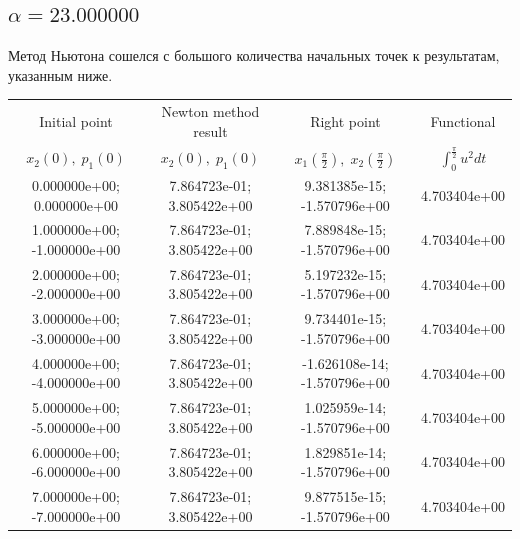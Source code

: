 \documentclass[titlepage]{article}
\def\l{\left}
\def\r{\right}
\begin{document}
\subsection{$\alpha = 23.000000$} 
Метод Ньютона сошелся с большого количества начальных точек к результатам, указанным ниже. \\ 
\begin{tabular}{ | c | c | c | c |} 
\hline 
Initial point  & Newton method result & Right point & Functional 
 \\ $x_2(0), \; p_1(0)$ & $x_2(0), \; p_1(0)$ & $x_1\l(\frac{\pi}{2}\r), \; x_2\l(\frac{\pi}{2}\r)$ & $\int_{0}^{\frac{\pi}{2}}u^2dt$  \\ \hline 
0.000000e+00; 0.000000e+00 & 7.864723e-01; 3.805422e+00 & 9.381385e-15; -1.570796e+00 & 4.703404e+00 \\ \hline 
1.000000e+00; -1.000000e+00 & 7.864723e-01; 3.805422e+00 & 7.889848e-15; -1.570796e+00 & 4.703404e+00 \\ \hline 
2.000000e+00; -2.000000e+00 & 7.864723e-01; 3.805422e+00 & 5.197232e-15; -1.570796e+00 & 4.703404e+00 \\ \hline 
3.000000e+00; -3.000000e+00 & 7.864723e-01; 3.805422e+00 & 9.734401e-15; -1.570796e+00 & 4.703404e+00 \\ \hline 
4.000000e+00; -4.000000e+00 & 7.864723e-01; 3.805422e+00 & -1.626108e-14; -1.570796e+00 & 4.703404e+00 \\ \hline 
5.000000e+00; -5.000000e+00 & 7.864723e-01; 3.805422e+00 & 1.025959e-14; -1.570796e+00 & 4.703404e+00 \\ \hline 
6.000000e+00; -6.000000e+00 & 7.864723e-01; 3.805422e+00 & 1.829851e-14; -1.570796e+00 & 4.703404e+00 \\ \hline 
7.000000e+00; -7.000000e+00 & 7.864723e-01; 3.805422e+00 & 9.877515e-15; -1.570796e+00 & 4.703404e+00 \\ \hline 
\end{tabular} 
\end{document}
